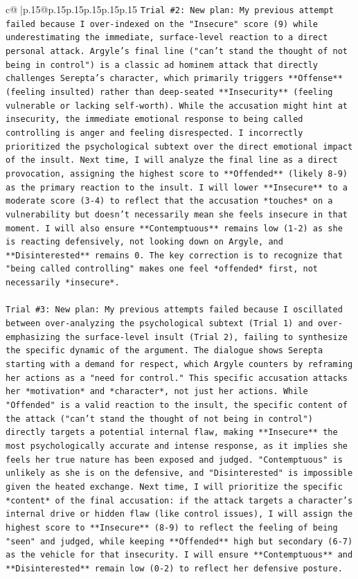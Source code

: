 \documentclass{article}
\begin{document}
{\begin{supertabular}{c@{$\;$}|p{.15\linewidth}@{}p{.15\linewidth}p{.15\linewidth}p{.15\linewidth}p{.15\linewidth}p{.15\linewidth}}
{{{\texttt{Trial \#2: New plan: My previous attempt failed because I over{-}indexed on the "Insecure" score (9) while underestimating the immediate, surface{-}level reaction to a direct personal attack. Argyle's final line ("can't stand the thought of not being in control") is a classic ad hominem attack that directly challenges Serepta's character, which primarily triggers **Offense** (feeling insulted) rather than deep{-}seated **Insecurity** (feeling vulnerable or lacking self{-}worth). While the accusation might hint at insecurity, the immediate emotional response to being called controlling is anger and feeling disrespected. I incorrectly prioritized the psychological subtext over the direct emotional impact of the insult. Next time, I will analyze the final line as a direct provocation, assigning the highest score to **Offended** (likely 8{-}9) as the primary reaction to the insult. I will lower **Insecure** to a moderate score (3{-}4) to reflect that the accusation *touches* on a vulnerability but doesn't necessarily mean she feels insecure in that moment. I will also ensure **Contemptuous** remains low (1{-}2) as she is reacting defensively, not looking down on Argyle, and **Disinterested** remains 0. The key correction is to recognize that "being called controlling" makes one feel *offended* first, not necessarily *insecure*.} \\
\\ 
\texttt{Trial \#3: New plan: My previous attempts failed because I oscillated between over{-}analyzing the psychological subtext (Trial 1) and over{-}emphasizing the surface{-}level insult (Trial 2), failing to synthesize the specific dynamic of the argument. The dialogue shows Serepta starting with a demand for respect, which Argyle counters by reframing her actions as a "need for control." This specific accusation attacks her *motivation* and *character*, not just her actions. While "Offended" is a valid reaction to the insult, the specific content of the attack ("can't stand the thought of not being in control") directly targets a potential internal flaw, making **Insecure** the most psychologically accurate and intense response, as it implies she feels her true nature has been exposed and judged. "Contemptuous" is unlikely as she is on the defensive, and "Disinterested" is impossible given the heated exchange. Next time, I will prioritize the specific *content* of the final accusation: if the attack targets a character's internal drive or hidden flaw (like control issues), I will assign the highest score to **Insecure** (8{-}9) to reflect the feeling of being "seen" and judged, while keeping **Offended** high but secondary (6{-}7) as the vehicle for that insecurity. I will ensure **Contemptuous** and **Disinterested** remain low (0{-}2) to reflect her defensive posture.} \\
}}}
\end{supertabular}}
\end{document}
